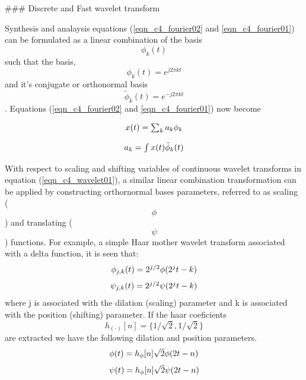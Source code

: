 ### Discrete and Fast wavelet transform

Synthesis and analaysis equations (\ref{eqn_c4_fourier02} and \ref{eqn_c4_fourier01}) can be formulated as a linear combination of the basis $$\phi_k(t)$$ such that the basis, $$\phi_k(t)=e^{j2\pi kt}$$ and it's conjugate or orthonormal basis $$\tilde{\phi}_k(t)=e^{-j2\pi kt}$$. Equations (\ref{eqn_c4_fourier02} and \ref{eqn_c4_fourier01}) now become

\begin{equation}
$$x(t)=\sum_{k}a_k\phi_k$$
\label{eqn_c4_dwt02}
\end{equation}

\begin{equation}
$$a_k=\int x(t)\tilde{\phi}_k(t)$$
\label{eqn_c4_dwt01}
\end{equation}

With respect to scaling and shifting variables of continuous wavelet transforms in equation (\ref{eqn_c4_wavelet01}), a similar linear combination transformation can be applied by constructing orthornormal bases parameters, referred to as scaling ($$\phi$$) and translating ($$\psi$$) functions. For example, a simple Haar mother wavelet transform associated with a delta function, it is seen that:
\begin{equation}
$$\phi_{j,k}(t)=2^{j/2}\phi(2^jt-k)$$
\label{eqn_c4_dwt03}
\end{equation}
\begin{equation}
$$\psi_{j,k}(t)=2^{j/2}\psi(2^jt-k)$$
\label{eqn_c4_dwt04}
\end{equation}
where j is associated with the dilation (scaling) parameter and k is associated with the position (shifting) parameter. If the haar coeficients $$h_{(\cdot)}[n]=\{1/\sqrt{2},1/\sqrt{2}\}$$ are extracted we have the following dilation and position parameters.
\begin{equation}
$$\phi(t)=h_\phi[n]\sqrt{2}\phi(2t-n)$$
\label{eqn_c4_dwt05}
\end{equation}
\begin{equation}
$$\psi(t)=h_\phi[n]\sqrt{2}\psi(2t-n)$$
\label{eqn_c4_dwt06}
\end{equation}

